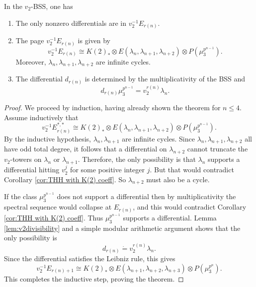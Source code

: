 \begin{thm}\label{key to proof}
In the $v_2$-BSS, one has 
\begin{enumerate}
	\item The only nonzero differentials are in $v_2^{-1}E_{r(n)}$.
	\item The page $v_2^{-1}E_{r(n)}$ is given by 
	\[
	v_2^{-1}E_{r(n)}\cong K(2)_*\otimes E(\lambda_n, \lambda_{n+1}, \lambda_{n+2})\otimes P(\mu_3^{p^{n-1}}). 
	\]
	Moreover, $\lambda_n, \lambda_{n+1},\lambda_{n+2}$ are infinite cycles. 
	
	\item The differential $d_{r(n)}$ is determined by the multiplicativity of the BSS and 
	\[
	d_{r(n)}\mu_3^{p^{n-1}}=v_2^{r(n)}\lambda_n. 
	\]
\end{enumerate}	
\end{thm}
\begin{proof}
	We proceed by induction, having already shown the theorem for $n\leq 4$. Assume inductively that 
	\[
	v_2^{-1}E_{r(n)}^{*,*}\cong K(2)_*\otimes E(\lambda_n, \lambda_{n+1}, \lambda_{n+2})\otimes P(\mu_3^{p^{n-1}}).
	\] 
	By the inductive hypothesis, $\lambda_n, \lambda_{n+1}$ are infinite cycles. Since $\lambda_n, \lambda_{n+1}, \lambda_{n+2}$ all have odd total degree, it follows that a differential on $\lambda_{n+2}$ cannot truncate the $v_2$-towers on $\lambda_n$ or $\lambda_{n+1}$. Therefore, the only possibility is that $\lambda_n$ supports a differential hitting $v_2^j$ for some positive integer $j$. 
	But that would contradict Corollary \ref{cor:THH with K(2) coeff}. So $\lambda_{n+2}$ must also be a cycle.
	
	If the class $\mu_3^{p^{n-1}}$ does not support a differential then by multiplicativity the spectral sequence would collapse at $E_{r(n)}$, and this would contradict Corollary \ref{cor:THH with K(2) coeff}. Thus $\mu_3^{p^{n-1}}$ supports a differential. Lemma \ref{lem:v2divisibility} and a simple modular arithmetic argument shows that the only possibility is 
	\[
	d_{r(n)}\dot{=}v_2^{r(n)}\lambda_n.
	\]
	Since the differential satisfies the Leibniz rule, this gives
	\[
	v_2^{-1}E_{r(n)+1}\cong K(2)_*\otimes E(\lambda_{n+1},\lambda_{n+2}, \lambda_{n+3})\otimes P(\mu_{3}^{p^n}).
	\]
	This completes the inductive step, proving the theorem.
\end{proof}

